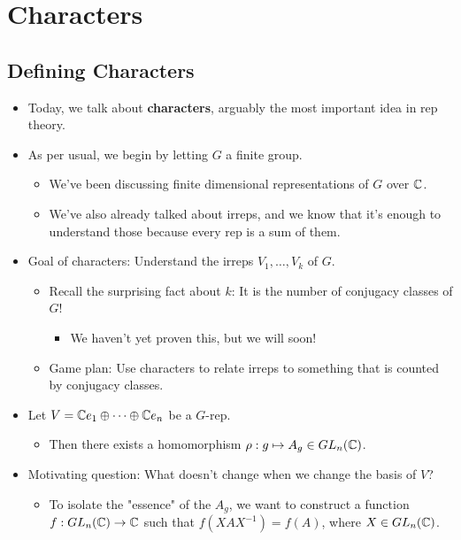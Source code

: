 \documentclass[../notes.tex]{subfiles}
\begin{document}
\chapter{Characters}
\section{Defining Characters}
\begin{itemize}
    \item {}Today, we talk about \textbf{characters}, arguably the most important idea in rep theory.
    \item As per usual, we begin by letting $G$ a finite group.
    \begin{itemize}
        \item We've been discussing finite dimensional representations of $G$ over $\mathbb{C}$.
        \item We've also already talked about irreps, and we know that it's enough to understand those because every rep is a sum of them.
    \end{itemize}
    \item Goal of characters: Understand the irreps $V_1,\dots,V_k$ of $G$.
    \begin{itemize}
        \item Recall the surprising fact about $k$: It is the number of conjugacy classes of $G$!
        \begin{itemize}
            \item We haven't yet proven this, but we will soon!
        \end{itemize}
        \item Game plan: Use characters to relate irreps to something that is counted by conjugacy classes.
    \end{itemize}
    \item Let $V=\mathbb{C} e_1\oplus\cdots\oplus\mathbb{C} e_n$ be a $G$-rep.
    \begin{itemize}
        \item Then there exists a homomorphism $\rho:g\mapsto A_g\in GL_n(\mathbb{C})$.
    \end{itemize}
    \item Motivating question: What doesn't change when we change the basis of $V$?
    \begin{itemize}
        \item To isolate the "essence" of the $A_g$, we want to construct a function $f:GL_n(\mathbb{C})\to\mathbb{C}$ such that $f(XAX^{-1})=f(A)$, where $X\in GL_n(\mathbb{C})$.
    \end{itemize}

\end{itemize}
\end{document}
